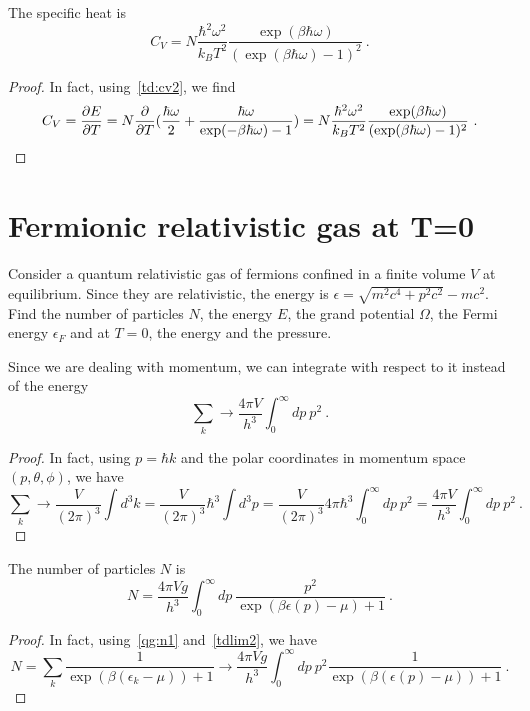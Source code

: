    The specific heat is 
    \begin{equation*}
        C_V = N \frac{\hbar^2 \omega^2}{k_B T^2} \frac{\exp(\beta \hbar \omega)}{(\exp(\beta \hbar \omega) - 1)^2} ~.
    \end{equation*}
    \begin{proof}
        In fact, using~\eqref{td:cv2}, we find
        \begin{equation*}
            C_V = \frac{\partial E}{\partial T} = N \frac{\partial}{\partial T} ( \frac{\hbar \omega}{2} + \frac{\hbar \omega}{\exp(- \beta \hbar \omega) - 1} ) = N \frac{\hbar^2 \omega^2}{k_B T^2} \frac{\exp(\beta \hbar \omega)}{(\exp(\beta \hbar \omega) - 1)^2} ~.
        \end{equation*}
    \end{proof}

\section{Fermionic relativistic gas at T=0}

    \begin{exercise}
        Consider a quantum relativistic gas of fermions confined in a finite volume $V$ at equilibrium. Since they are relativistic, the energy is $\epsilon = \sqrt{m^2 c^4 + p^2 c^2} - m c^2$. 
        Find the number of particles $N$, the energy $E$, the grand potential $\Omega$, the Fermi energy $\epsilon_F$ and at $T=0$, the energy and the pressure.
    \end{exercise}

    Since we are dealing with momentum, we can integrate with respect to it instead of the energy 
    \begin{equation}\label{tdlim2}
        \sum_k \rightarrow \frac{4 \pi V}{h^3} \int_0^\infty dp ~ p^2 ~.
    \end{equation}  
    \begin{proof}
        In fact, using $p = \hbar k$ and the polar coordinates in momentum space $(p, \theta, \phi)$, we have
        \begin{equation*}
            \sum_k \rightarrow \frac{V}{(2\pi)^3} \int d^3 k = \frac{V}{(2\pi)^3} \hbar^3 \int d^3 p = \frac{V}{(2\pi)^3} 4 \pi \hbar^3 \int_0^\infty dp ~ p^2 = \frac{4 \pi V}{h^3} \int_0^\infty dp ~ p^2 ~.
        \end{equation*}
    \end{proof}

    The number of particles $N$ is 
    \begin{equation*}
        N = \frac{4 \pi V g}{h^3} \int_0^\infty dp ~ \frac{p^2}{\exp(\beta \epsilon(p) - \mu) + 1} ~.
    \end{equation*}
    \begin{proof}
        In fact, using~\eqref{qg:n1} and~\eqref{tdlim2}, we have 
        \begin{equation}
            N = \sum_k \frac{1}{\exp(\beta(\epsilon_k - \mu)) + 1} \rightarrow \frac{4 \pi V g}{h^3} \int_0^\infty dp ~ p^2 \frac{1}{\exp(\beta(\epsilon (p) - \mu)) + 1} ~.
        \end{equation}
    \end{proof}

